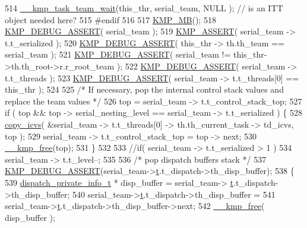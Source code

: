 \begin{DoxyCode}
{514         \hyperlink{kmp_8h_afd36f17a7257b41ac1c0ac640225e292}{\_\_kmp\_task\_team\_wait}(this\_thr, serial\_team, NULL ); \textcolor{comment}{// is an ITT object needed
       here?}
515 \textcolor{preprocessor}{   #endif}
516 \textcolor{preprocessor}{}
517     \hyperlink{kmp__os_8h_ab19ae0836bf2f1ac24e5cfc97c6d7d41}{KMP\_MB}();
518     \hyperlink{kmp__debug_8h_ad766efc30e33e28634691088e80cdf08}{KMP\_DEBUG\_ASSERT}( serial\_team );
519     \hyperlink{kmp__debug_8h_a5323a368e8ba273b17c46906dd9ec78c}{KMP\_ASSERT}(       serial\_team -> t.t\_serialized );
520     \hyperlink{kmp__debug_8h_ad766efc30e33e28634691088e80cdf08}{KMP\_DEBUG\_ASSERT}( this\_thr -> th.th\_team == serial\_team );
521     \hyperlink{kmp__debug_8h_ad766efc30e33e28634691088e80cdf08}{KMP\_DEBUG\_ASSERT}( serial\_team != this\_thr->th.th\_root->r.r\_root\_team );
522     \hyperlink{kmp__debug_8h_ad766efc30e33e28634691088e80cdf08}{KMP\_DEBUG\_ASSERT}( serial\_team -> t.t\_threads );
523     \hyperlink{kmp__debug_8h_ad766efc30e33e28634691088e80cdf08}{KMP\_DEBUG\_ASSERT}( serial\_team -> t.t\_threads[0] == this\_thr );
524 
525     \textcolor{comment}{/* If necessary, pop the internal control stack values and replace the team values */}
526     top = serial\_team -> t.t\_control\_stack\_top;
527     \textcolor{keywordflow}{if} ( top && top -> serial\_nesting\_level == serial\_team -> t.t\_serialized ) \{
528         \hyperlink{kmp_8h_a87574bd68566bdaab6ba1cd63223ab46}{copy\_icvs}( &serial\_team -> t.t\_threads[0] -> th.th\_current\_task -> td\_icvs, top );
529         serial\_team -> t.t\_control\_stack\_top = top -> next;
530         \hyperlink{kmp_8h_a052396231429341ba56a7c1ceacbaa2f}{\_\_kmp\_free}(top);
531     \}
532 
533     \textcolor{comment}{//if( serial\_team -> t.t\_serialized > 1 )}
534     serial\_team -> t.t\_level--;
535 
536     \textcolor{comment}{/* pop dispatch buffers stack */}
537     \hyperlink{kmp__debug_8h_ad766efc30e33e28634691088e80cdf08}{KMP\_DEBUG\_ASSERT}(serial\_team->\hyperlink{unionkmp__team_a87cf4571108a61b446e809094f8c0362}{t}.t\_dispatch->th\_disp\_buffer);
538     \{
539         \hyperlink{kmp_8h_a39b4260bfb46eb4f113a70e0a8ac26ea}{dispatch\_private\_info\_t} * disp\_buffer = serial\_team->
      \hyperlink{unionkmp__team_a87cf4571108a61b446e809094f8c0362}{t}.t\_dispatch->th\_disp\_buffer;
540         serial\_team->\hyperlink{unionkmp__team_a87cf4571108a61b446e809094f8c0362}{t}.t\_dispatch->th\_disp\_buffer =
541             serial\_team->\hyperlink{unionkmp__team_a87cf4571108a61b446e809094f8c0362}{t}.t\_dispatch->th\_disp\_buffer->next;
542         \hyperlink{kmp_8h_a052396231429341ba56a7c1ceacbaa2f}{\_\_kmp\_free}( disp\_buffer );
}
\end{DoxyCode}
